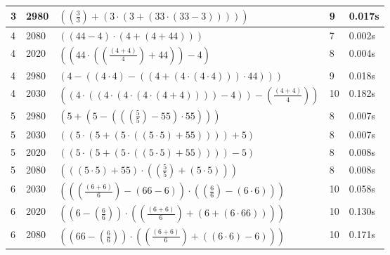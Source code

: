 \documentclass{article}
\theoremstyle{nonumberplain}
\begin{document}
\begin{center}
\begin{longtable}{ | l | l | p{9.5cm} | l | l | }
            3 & 2980 & \( \left(\left(\frac{3}{3}\right) + \left(3 \cdot \left(3 + \left(33 \cdot \left(33 - 3\right)\right)\right)\right)\right) \) & 9 & 0.017s \\\hline
            4 & 2080 & \( \left(\left(44 - 4\right) \cdot \left(4 + \left(4 + 44\right)\right)\right) \) & 7 & 0.002s \\\hline
            4 & 2020 & \( \left(\left(44 \cdot \left(\left(\frac{\left(4 + 4\right)}{4}\right) + 44\right)\right) - 4\right) \) & 8 & 0.004s \\\hline
            4 & 2980 & \( \left(4 - \left(\left(4 \cdot 4\right) - \left(\left(4 + \left(4 \cdot \left(4 \cdot 4\right)\right)\right) \cdot 44\right)\right)\right) \) & 9 & 0.018s \\\hline
            4 & 2030 & \( \left(\left(4 \cdot \left(\left(4 \cdot \left(4 \cdot \left(4 \cdot \left(4 + 4\right)\right)\right)\right) - 4\right)\right) - \left(\frac{\left(4 + 4\right)}{4}\right)\right) \) & 10 & 0.182s \\\hline
            5 & 2980 & \( \left(5 + \left(5 - \left(\left(\left(\frac{5}{5}\right) - 55\right) \cdot 55\right)\right)\right) \) & 8 & 0.007s \\\hline
            5 & 2030 & \( \left(\left(5 \cdot \left(5 + \left(5 \cdot \left(\left(5 \cdot 5\right) + 55\right)\right)\right)\right) + 5\right) \) & 8 & 0.007s \\\hline
            5 & 2020 & \( \left(\left(5 \cdot \left(5 + \left(5 \cdot \left(\left(5 \cdot 5\right) + 55\right)\right)\right)\right) - 5\right) \) & 8 & 0.008s \\\hline
            5 & 2080 & \( \left(\left(\left(5 \cdot 5\right) + 55\right) \cdot \left(\left(\frac{5}{5}\right) + \left(5 \cdot 5\right)\right)\right) \) & 8 & 0.008s \\\hline
            6 & 2030 & \( \left(\left(\left(\frac{\left(6 + 6\right)}{6}\right) - \left(66 - 6\right)\right) \cdot \left(\left(\frac{6}{6}\right) - \left(6 \cdot 6\right)\right)\right) \) & 10 & 0.058s \\\hline
            6 & 2020 & \( \left(\left(6 - \left(\frac{6}{6}\right)\right) \cdot \left(\left(\frac{\left(6 + 6\right)}{6}\right) + \left(6 + \left(6 \cdot 66\right)\right)\right)\right) \) & 10 & 0.130s \\\hline
            6 & 2080 & \( \left(\left(66 - \left(\frac{6}{6}\right)\right) \cdot \left(\left(\frac{\left(6 + 6\right)}{6}\right) + \left(\left(6 \cdot 6\right) - 6\right)\right)\right) \) & 10 & 0.171s \\\hline

\end{longtable}
\end{center}
\end{document}
